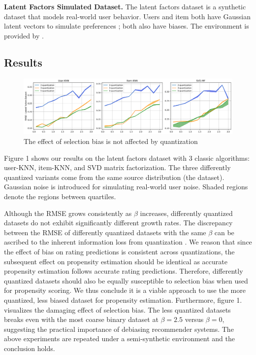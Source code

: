 \documentclass{article}
\begin{document}
\textbf{Latent Factors Simulated Dataset.}
The latent factors dataset is a synthetic dataset that models real-world user behavior. Users and item both have Gaussian latent vectors to simulate preferences \cite{koren2008factorization} \cite{koren2009matrix}; both also have biases. The environment is provided by \cite{krauth2020offline}.

\subsection{Results}
\begin{figure}
  \centering
  \includegraphics[width=\textwidth]{1.png}
  \caption{The effect of selection bias is not affected by quantization}
\end{figure}
Figure 1 shows our results on the latent factors dataset with 3 classic algorithms: user-KNN, item-KNN, and SVD matrix factorization. The three differently quantized variants come from the same source distribution (the dataset). Gaussian noise is introduced for simulating real-world user noise. Shaded regions denote the regions between quartiles. 

Although the RMSE grows consistently as $\beta$ increases, differently quantized datasets do not exhibit significantly different growth rates. The discrepancy between the RMSE of differently quantized datasets with the same $\beta$ can be ascribed to the inherent information loss from quantization \cite{widrow1996statistical}. We reason that since the effect of bias on rating predictions is consistent across quantizations, the subsequent effect on propensity estimation should be identical as accurate propensity estimation follows accurate rating predictions. Therefore, differently quantized datasets should also be equally susceptible to selection bias when used for propensity scoring. We thus conclude it is a viable approach to use the more quantized, less biased dataset for propensity estimation. Furthermore, figure 1. visualizes the damaging effect of selection bias. The less quantized datasets breaks even with the most coarse binary dataset at $\beta=2.5$ versus $\beta=0$, suggesting the practical importance of debiasing recommender systems. The above experiments are repeated under a semi-synthetic environment and the conclusion holds.
\end{document}
